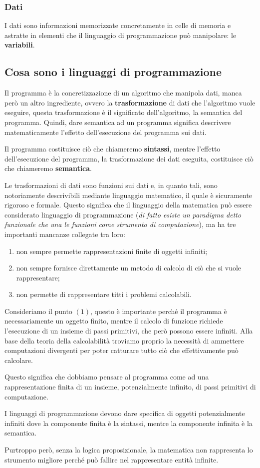 \documentclass[oneside,a4paper,11pt]{book}
\theoremstyle{italicstyle}
\theoremstyle{normStyle}
\begin{document}
\subsubsection{Dati}
I dati sono informazioni memorizzate concretamente in celle di memoria 
e astratte in elementi che il linguaggio di programmazione può manipolare:
le \textbf{variabili}.
\subsection{Cosa sono i linguaggi di programmazione}
Il programma è la concretizzazione di un algoritmo che manipola 
dati, manca però un altro ingrediente, ovvero la \textbf{trasformazione} di dati 
che l'algoritmo vuole eseguire, questa trasformazione è il significato dell'algoritmo, 
la semantica del programma. Quindi, dare semantica ad un programma significa 
descrivere matematicamente l'effetto dell'esecuzione del programma sui dati.

Il programma costituisce ciò che chiameremo \textbf{sintassi}, mentre l'effetto 
dell'esecuzione del programma, la trasformazione dei dati eseguita, 
costituisce ciò che chiameremo \textbf{semantica}.

Le trasformazioni di dati sono funzioni sui dati e, in quanto tali,
sono notoriamente descrivibili mediante linguaggio matematico, il quale 
è sicuramente rigoroso e formale. Questo significa che il linguaggio 
della matematica può essere considerato linguaggio di programmazione (\textit{di 
fatto esiste un paradigma detto funzionale che una le funzioni come strumento di 
computazione}), ma ha tre importanti mancanze collegate tra loro:
\begin{enumerate}
  \item non sempre permette rappresentazioni finite di oggetti infiniti;
  \item non sempre fornisce direttamente un metodo di calcolo di ciò che si vuole 
  rappresentare;
  \item non permette di rappresentare titti i problemi calcolabili.
\end{enumerate}
Consideriamo il punto $(1)$, questo è importante perché il programma 
è necessariamente un oggetto finito, mentre il calcolo di funzione richiede 
l'esecuzione di un insieme di passi primitivi, che però possono essere 
infiniti. Alla base della teoria della calcolabilità troviamo proprio 
la necessità di ammettere computazioni divergenti per poter catturare 
tutto ciò che effettivamente può calcolare.

Questo significa che dobbiamo pensare al programma come ad una rappresentazione 
finita di un insieme, potenzialmente infinito, di passi primitivi di 
computazione. 
\begin{tcolorbox}
I linguaggi di programmazione devono dare specifica di 
oggetti potenzialmente infiniti dove la componente finita è la sintassi, mentre 
la componente infinita è la semantica.
\end{tcolorbox}
Purtroppo però, senza la logica proposizionale,
la matematica non rappresenta lo strumento migliore perché può fallire nel 
rappresentare entità infinite.
\end{document}
